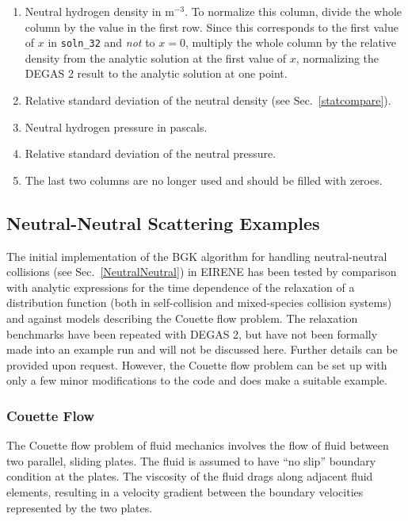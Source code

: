 \documentclass[12pt]{report}
\begin{document}
\begin{enumerate}
\begin{enumerate}
  \item Neutral hydrogen density in m$^{-3}$. To normalize this column,
divide the whole column by the value in the first row. Since this corresponds
to the first value of $x$ in {\tt soln\_32} and {\em not} to $x = 0$, 
multiply the whole column by the relative density from the analytic
solution at the first value of $x$, normalizing the DEGAS 2 result
to the analytic solution at one point.
  \item Relative standard deviation of the neutral density (see
Sec.~\ref{statcompare}).
  \item Neutral hydrogen pressure in pascals.
  \item Relative standard deviation of the neutral pressure.
  \item The last two columns are no longer used and should be filled with
zeroes.
\end{enumerate}
\end{enumerate}

\subsection{Neutral-Neutral Scattering Examples}

The initial implementation of the BGK algorithm for handling neutral-neutral
collisions (see Sec.~\ref{NeutralNeutral}) in EIRENE 
has been tested by comparison
with analytic expressions for the time dependence of the relaxation of 
a distribution function (both in self-collision and
mixed-species collision systems) and against models describing the
Couette flow problem.\cite{Mayxx} The relaxation benchmarks have been
repeated with DEGAS 2, but have not been formally made into an example
run and will not be discussed here. 
Further details can be provided upon request. However, the Couette flow
problem can be set up with only a few minor modifications to the code and
does make a suitable example.

\subsubsection{Couette Flow}
\label{couetteflow}

The Couette flow problem of fluid mechanics involves the flow of fluid between
two parallel, sliding plates. The fluid is assumed to have ``no slip''
boundary condition at the plates. The viscosity of the fluid drags
along adjacent fluid elements, resulting in a velocity gradient
between the boundary velocities represented by the two plates.
\end{document}
